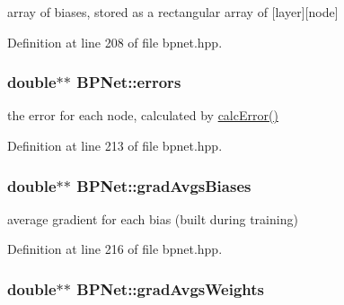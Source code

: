 array of biases, stored as a rectangular array of \mbox{[}layer\mbox{]}\mbox{[}node\mbox{]} 



Definition at line 208 of file bpnet.\+hpp.

\subsubsection[{\texorpdfstring{errors}{errors}}]{\setlength{\rightskip}{0pt plus 5cm}double$\ast$$\ast$ B\+P\+Net\+::errors\hspace{0.3cm}{\ttfamily [protected]}}\hypertarget{classBPNet_a6b60b49ea0c157bbe4d785f74fa3f208}{}\label{classBPNet_a6b60b49ea0c157bbe4d785f74fa3f208}


the error for each node, calculated by \hyperlink{classBPNet_a98e5db7247f0358375c27d1bb091f6ab}{calc\+Error()} 



Definition at line 213 of file bpnet.\+hpp.

\subsubsection[{\texorpdfstring{grad\+Avgs\+Biases}{gradAvgsBiases}}]{\setlength{\rightskip}{0pt plus 5cm}double$\ast$$\ast$ B\+P\+Net\+::grad\+Avgs\+Biases\hspace{0.3cm}{\ttfamily [protected]}}\hypertarget{classBPNet_a90e9fb8bde12a2520186d8084628109b}{}\label{classBPNet_a90e9fb8bde12a2520186d8084628109b}


average gradient for each bias (built during training) 



Definition at line 216 of file bpnet.\+hpp.

\subsubsection[{\texorpdfstring{grad\+Avgs\+Weights}{gradAvgsWeights}}]{\setlength{\rightskip}{0pt plus 5cm}double$\ast$$\ast$ B\+P\+Net\+::grad\+Avgs\+Weights\hspace{0.3cm}{\ttfamily [protected]}}\hypertarget{classBPNet_a72567d85f25041df70225b5e98ae3b90}{}\label{classBPNet_a72567d85f25041df70225b5e98ae3b90}


